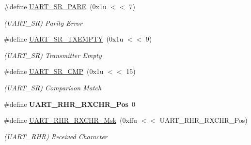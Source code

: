 \begin{DoxyCompactItemize}
\mbox{\label{group__SAME70__UART_ga937c55851deda799bb2f2ee96e6fd81b}} 
\#define \mbox{\hyperlink{group__SAME70__UART_ga937c55851deda799bb2f2ee96e6fd81b}{U\+A\+R\+T\+\_\+\+S\+R\+\_\+\+P\+A\+RE}}~(0x1u $<$$<$ 7)
\begin{DoxyCompactList}\small\item\em (U\+A\+R\+T\+\_\+\+SR) Parity Error \end{DoxyCompactList}\item 
\mbox{\label{group__SAME70__UART_gab3c2d147ce2624a3f11c45d2051828af}} 
\#define \mbox{\hyperlink{group__SAME70__UART_gab3c2d147ce2624a3f11c45d2051828af}{U\+A\+R\+T\+\_\+\+S\+R\+\_\+\+T\+X\+E\+M\+P\+TY}}~(0x1u $<$$<$ 9)
\begin{DoxyCompactList}\small\item\em (U\+A\+R\+T\+\_\+\+SR) Transmitter Empty \end{DoxyCompactList}\item 
\mbox{\label{group__SAME70__UART_gae60bfce92b111f1320c0543fc83cbb48}} 
\#define \mbox{\hyperlink{group__SAME70__UART_gae60bfce92b111f1320c0543fc83cbb48}{U\+A\+R\+T\+\_\+\+S\+R\+\_\+\+C\+MP}}~(0x1u $<$$<$ 15)
\begin{DoxyCompactList}\small\item\em (U\+A\+R\+T\+\_\+\+SR) Comparison Match \end{DoxyCompactList}\item 
\mbox{\label{group__SAME70__UART_ga28f6c82f55b0652c7200494c2ab2b271}} 
\#define {\bfseries U\+A\+R\+T\+\_\+\+R\+H\+R\+\_\+\+R\+X\+C\+H\+R\+\_\+\+Pos}~0
\item 
\mbox{\label{group__SAME70__UART_gaba17d1d8d32862be836e832b08b8a269}} 
\#define \mbox{\hyperlink{group__SAME70__UART_gaba17d1d8d32862be836e832b08b8a269}{U\+A\+R\+T\+\_\+\+R\+H\+R\+\_\+\+R\+X\+C\+H\+R\+\_\+\+Msk}}~(0xffu $<$$<$ U\+A\+R\+T\+\_\+\+R\+H\+R\+\_\+\+R\+X\+C\+H\+R\+\_\+\+Pos)
\begin{DoxyCompactList}\small\item\em (U\+A\+R\+T\+\_\+\+R\+HR) Received Character \end{DoxyCompactList}\item 
\mbox{\label{group__SAME70__UART_ga576a896cd32287d9b6c3b8d19a70b6f1}} 

\end{DoxyCompactItemize}

